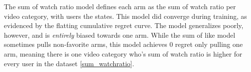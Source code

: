 The sum of watch ratio model defines each arm as the sum of watch ratio per video category, with users the states. This model did converge during training, as evidenced by the flatting cumulative regret curve. The model generalizes poorly, however, and is \textit{entirely} biased towards one arm. While the sum of like model sometimes pulls non-favorite arms, this model achieves 0 regret only pulling one arm, meaning there is one video category who's sum of watch ratio is higher for every user in the dataset \ref{sum_watchratio}.




    




